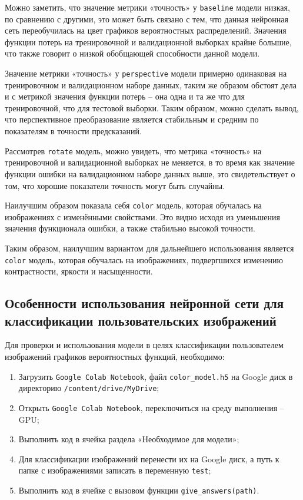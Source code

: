 \documentclass[14pt, russian]{scrartcl}
\begin{document}
Можно заметить, что значение метрики «точность» у \verb|baseline| модели низкая, по сравнению с другими, это может быть связано с тем, что данная нейронная сеть переобучилась на цвет графиков вероятностных распределений. Значения функции потерь на тренировочной и валидационной выборках крайне большие, что также говорит о низкой обобщающей способности данной модели.

Значение метрики «точность» у \verb|perspective| модели примерно одинаковая на тренировочном и валидационном наборе данных, таким же образом обстоят дела и с метрикой значения функции потерь -- она одна и та же что для тренировочной, что для тестовой выборки. Таким образом, можно сделать вывод, что перспективное преобразование является стабильным и средним по показателям в точности предсказаний.

Рассмотрев \verb|rotate| модель, можно увидеть, что метрика «точность» на тренировочной и валидационной выборках не меняется, в то время как значение функции ошибки на валидационном наборе данных выше, это свидетельствует о том, что хорошие показатели точность могут быть случайны.

Наилучшим образом показала себя \verb|color| модель, которая обучалась на изображениях с изменёнными свойствами. Это видно исходя из уменьшения значения функционала ошибки, а также стабильно высокой точности. 

Таким образом, наилучшим вариантом для дальнейшего использования является \verb|color| модель, которая обучалась на изображениях, подвергшихся изменению контрастности, яркости и насыщенности. 

\subsection{Особенности использования нейронной сети для классификации пользовательских изображений}

Для проверки и использования модели в целях классификации пользователем изображений графиков вероятностных функций, необходимо:
\begin{enumerate}
    \item Загрузить \verb|Google Colab Notebook|, файл \verb|color_model.h5| на Google диск в директорию \verb|/content/drive/MyDrive|;
    \item Открыть \verb|Google Colab Notebook|, переключиться на среду выполнения -- GPU;
    \item Выполнить код в ячейка раздела «Необходимое для модели»;
    \item Для классификации изображений перенести их на Google диск, а путь к папке с изображениями записать в переменную \verb|test|;
    \item Выполнить код в ячейке с вызовом функции \verb|give_answers(path)|.
\end{enumerate}
 
\end{document}
